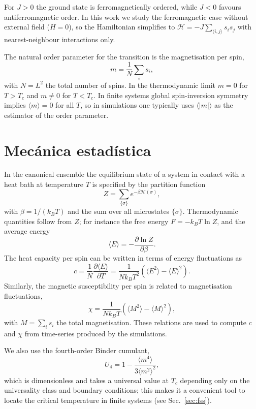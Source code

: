For $J>0$ the ground state is ferromagnetically ordered, while $J<0$ favours antiferromagnetic order. In this work we study the ferromagnetic case without external field ($H=0$), so the Hamiltonian simplifies to $\mathcal{H}=-J\sum_{\langle i,j\rangle}s_i s_j$ with nearest-neighbour interactions only.

The natural order parameter for the transition is the magnetisation per spin,
\[ m=\frac{1}{N}\sum_i s_i, \]
with $N=L^2$ the total number of spins. In the thermodynamic limit $m=0$ for $T>T_c$ and $m\neq0$ for $T<T_c$. In finite systems global spin-inversion symmetry implies $\langle m\rangle=0$ for all $T$, so in simulations one typically uses $\langle|m|\rangle$ as the estimator of the order parameter.

\section{Mecánica estadística}

In the canonical ensemble the equilibrium state of a system in contact with a heat bath at temperature $T$ is specified by the partition function
\[
Z=\sum_{\{\sigma\}} e^{-\beta\mathcal{H}(\sigma)},
\]
with $\beta=1/(k_B T)$ and the sum over all microstates $\{\sigma\}$. Thermodynamic quantities follow from $Z$; for instance the free energy $F=-k_B T\ln Z$, and the average energy
\[ \langle E \rangle = -\frac{\partial \ln Z}{\partial \beta}. \]
The heat capacity per spin can be written in terms of energy fluctuations as
\begin{equation} \label{eq:Cv}
    c = \frac{1}{N}\frac{\partial \langle E \rangle}{\partial T} = \frac{1}{N k_B T^2}\left(\langle E^2 \rangle - \langle E \rangle^2\right).
\end{equation}
Similarly, the magnetic susceptibility per spin is related to magnetisation fluctuations,
\[ \chi = \frac{1}{N k_B T}\left(\langle M^2 \rangle - \langle M \rangle^2\right), \]
with $M=\sum_i s_i$ the total magnetisation. These relations are used to compute $c$ and $\chi$ from time-series produced by the simulations.

We also use the fourth-order Binder cumulant,
\[ U_4 = 1 - \frac{\langle m^4 \rangle}{3\langle m^2 \rangle^2}, \]
which is dimensionless and takes a universal value at $T_c$ depending only on the universality class and boundary conditions; this makes it a convenient tool to locate the critical temperature in finite systems (see Sec.~\ref{sec:fss}).

